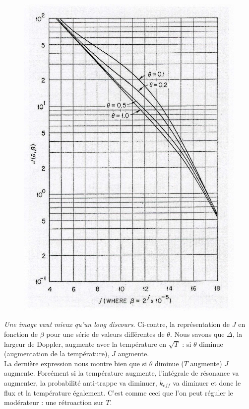 	\begin{figure}
	\vspace{-5mm}
	\includegraphics[scale=0.22]{ch8/image2}
	\end{figure}
	\textit{Une image vaut mieux qu'un long discours}. Ci-contre, la représentation de $J$ en fonction
	de $\beta$ pour une série de valeurs différentes de $\theta$. Nous savons que $\Delta$, la 
	largeur de Doppler, augmente avec la température en $\sqrt{T}$ : si $\theta$ diminue (augmentation
	de la température), $J$ augmente.\\
	
	La dernière expression nous montre bien que si $\theta$ diminue ($T$ augmente) $J$ augmente. 
	Forcément si la température augmente, l'intégrale de résonance va augmenter, la probabilité 
	anti-trappe va diminuer, $k_{eff}$ va diminuer et donc le flux et la température également. C'est
	comme ceci que l'on peut réguler le modérateur : une rétroaction sur $T$.
	

